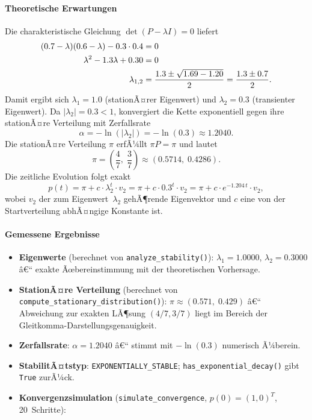 ﻿\documentclass[a4paper,12pt]{report}
\theoremstyle{definition}
\begin{document}
\paragraph{Theoretische Erwartungen}

Die charakteristische Gleichung $\det(P - \lambda I) = 0$ liefert
\begin{align}
	(0.7 - \lambda)(0.6 - \lambda) - 0.3 \cdot 0.4 &= 0 \notag \\
	\lambda^2 - 1.3\lambda + 0.30 &= 0 \notag \\
	\lambda_{1,2} &= \frac{1.3 \pm \sqrt{1.69 - 1.20}}{2}
	= \frac{1.3 \pm 0.7}{2}.
\end{align}
Damit ergibt sich $\lambda_1 = 1.0$ (stationÃ¤rer Eigenwert) und
$\lambda_2 = 0.3$ (transienter Eigenwert).  Da $|\lambda_2| = 0.3 < 1$,
konvergiert die Kette exponentiell gegen ihre stationÃ¤re Verteilung mit
Zerfallsrate
\[
\alpha = -\ln(|\lambda_2|) = -\ln(0.3) \approx 1.2040.
\]
Die stationÃ¤re Verteilung $\pi$ erfÃ¼llt $\pi P = \pi$ und lautet
\[
\pi = \left(\frac{4}{7},\; \frac{3}{7}\right) \approx (0.5714,\; 0.4286).
\]
Die zeitliche Evolution folgt exakt
\begin{equation}
	p(t) = \pi + c \cdot \lambda_2^t \cdot v_2
	= \pi + c \cdot 0.3^t \cdot v_2
	= \pi + c \cdot e^{-1.204\,t} \cdot v_2,
	\label{eq:konvergenz}
\end{equation}
wobei $v_2$ der zum Eigenwert~$\lambda_2$ gehÃ¶rende Eigenvektor und
$c$ eine von der Startverteilung abhÃ¤ngige Konstante ist.

\paragraph{Gemessene Ergebnisse}

\begin{itemize}
	\item \textbf{Eigenwerte} (berechnet von \texttt{analyze\_stability()}):
	$\lambda_1 = 1.0000$, $\lambda_2 = 0.3000$ â€“ exakte
	Ãœbereinstimmung mit der theoretischen Vorhersage.
	
	\item \textbf{StationÃ¤re Verteilung} (berechnet von
	\texttt{compute\_stationary\_distribu\newline tion()}):
	$\pi \approx (0.571,\; 0.429)$ â€“ Abweichung zur exakten
	LÃ¶sung $(4/7, 3/7)$ liegt im Bereich der
	Gleitkomma-Darstellungsgenauigkeit.
	
	\item \textbf{Zerfallsrate}: $\alpha = 1.2040$ â€“ stimmt mit
	$-\ln(0.3)$ numerisch Ã¼berein.
	
	\item \textbf{StabilitÃ¤tstyp}: \texttt{EXPONENTIALLY\_STABLE};
	\texttt{has\_exponential\_decay()} gibt \texttt{True}
	zurÃ¼ck.
	
	\item \textbf{Konvergenzsimulation} (\texttt{simulate\_convergence},
	$p(0) = (1, 0)^T$, 20~Schritte):
\end{itemize}
\end{document}

